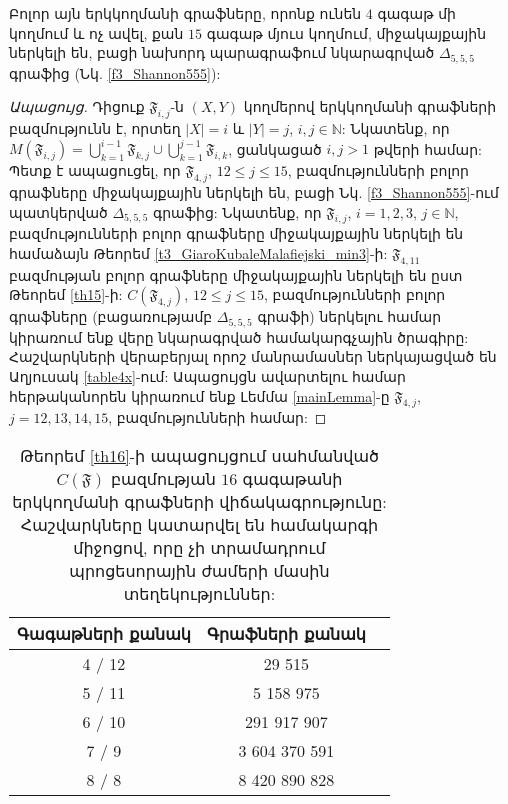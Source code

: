 \begin{hide}
\begin{theorem}
\label{th4x}
Բոլոր այն երկկողմանի գրաֆները, որոնք ունեն $4$ գագաթ մի կողմում և ոչ ավել, քան $15$ գագաթ մյուս կողմում, միջակայքային ներկելի են, բացի նախորդ պարագրաֆում նկարագրված $\Delta_{5,5,5}$ գրաֆից (Նկ. \ref{f3_Shannon555}):
\end{theorem}
\begin{proof}[Ապացույց]
Դիցուք $\mathfrak{F}_{i,j}$-ն $(X,Y)$ կողմերով երկկողմանի գրաֆների բազմությունն է, որտեղ $|X|=i$ և $|Y| = j$, $i, j \in \mathbb{N}$: Նկատենք, որ $M(\mathfrak{F}_{i,j})=\bigcup\limits_{k=1}^{i-1}{\mathfrak{F}_{k,j}} \cup \bigcup\limits_{k=1}^{j-1}{\mathfrak{F}_{i,k}}$, ցանկացած $i,j>1$ թվերի համար: Պետք է ապացուցել, որ $\mathfrak{F}_{4,j}$, $12 \leq j \leq 15$, բազմությունների բոլոր գրաֆները միջակայքային ներկելի են, բացի Նկ. \ref{f3_Shannon555}-ում պատկերված $\Delta_{5,5,5}$ գրաֆից: Նկատենք, որ $\mathfrak{F}_{i,j}$, $i=1,2,3$, $j \in \mathbb{N}$, բազմությունների բոլոր գրաֆները միջակայքային ներկելի են համաձայն Թեորեմ \ref{t3_GiaroKubaleMalafiejski_min3}-ի: $\mathfrak{F}_{4,11}$ բազմության բոլոր գրաֆները միջակայքային ներկելի են ըստ Թեորեմ \ref{th15}-ի: $C(\mathfrak{F}_{4,j})$, $12 \leq j \leq 15$, բազմությունների բոլոր գրաֆները (բացառությամբ $\Delta_{5,5,5}$ գրաֆի) ներկելու համար կիրառում ենք վերը նկարագրված համակարգչային ծրագիրը: Հաշվարկների վերաբերյալ որոշ մանրամասներ ներկայացված են Աղյուսակ \ref{table4x}-ում: Ապացույցն ավարտելու համար հերթականորեն կիրառում ենք Լեմմա \ref{mainLemma}-ը $\mathfrak{F}_{4,j}$, $j=12,13,14,15$, բազմությունների համար:
\end{proof}

\begin{table}[t]
\renewcommand{\arraystretch}{1.2}
\begin{center}
\begin{tabular}{|c|c|c|}
\hline
Գագաթների քանակ & Գրաֆների քանակ \\
\hline
4 / 12 & 29 515  \\
\hline
5 / 11 & 5 158 975  \\
\hline
6 / 10 & 291 917 907 \\
\hline
7 / 9 & 3 604 370 591 \\
\hline
8 / 8 & 8 420 890 828 \\
\hline
\end{tabular}
\end{center}
\caption{Թեորեմ \ref{th16}-ի ապացույցում սահմանված $C(\mathfrak{F})$ բազմության $16$ գագաթանի երկկողմանի գրաֆների վիճակագրությունը: Հաշվարկները կատարվել են \cite{MamikonyanGithub} համակարգի միջոցով, որը չի տրամադրում պրոցեսորային ժամերի մասին տեղեկություններ:}
\label{table16}
\end{table}


\end{hide}
